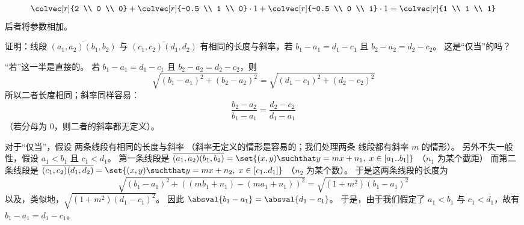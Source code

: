 \begin{exercises}
\begin{answer}
\begin{exparts}
          \begin{equation*}
            \colvec[r]{2 \\ 0 \\ 0}
              +\colvec[r]{-0.5 \\ 1 \\ 0}\cdot 1
              +\colvec[r]{-0.5 \\ 0 \\ 1}\cdot 1
            =\colvec[r]{1 \\ 1 \\ 1}
          \end{equation*}
          后者将参数相加。
      \end{exparts}
    \end{answer}
  \item 
    证明：线段
    \( \overline{(a_1,a_2)(b_1,b_2)} \) 与
    \( \overline{(c_1,c_2)(d_1,d_2)} \)
    有相同的长度与斜率，若
    \(  b_1-a_1=d_1-c_1 \) 且 \( b_2-a_2=d_2-c_2 \)。
    这是“仅当”的吗？
    \begin{answer}
      “若”这一半是直接的。
      若 \( b_1-a_1=d_1-c_1 \) 且 \( b_2-a_2=d_2-c_2 \)，则
      \begin{equation*}
        \sqrt{(b_1-a_1)^2+(b_2-a_2)^2}
        =\sqrt{(d_1-c_1)^2+(d_2-c_2)^2}
      \end{equation*}
      所以二者长度相同；斜率同样容易：
      \begin{equation*}
        \frac{b_2-a_2}{b_1-a_1}
        =\frac{d_2-c_2}{d_1-a_1}
      \end{equation*}
      （若分母为 \( 0 \)，则二者的斜率都无定义）。

     对于“仅当”，假设
     两条线段有相同的长度与斜率
     （斜率无定义的情形是容易的；我们处理两条
     线段都有斜率 \( m \) 的情形）。
     另外不失一般性，假设 $a_1<b_1$ 且
     $c_1<d_1$。
     第一条线段是
     \( \overline{(a_1,a_2)(b_1,b_2)}=
     \set{(x,y)\suchthat y=mx+n_1,\; x\in [a_1..b_1]} \)
     （$n_1$ 为某个截距）
     而第二条线段是 \( \overline{(c_1,c_2)(d_1,d_2)}=
     \set{(x,y)\suchthat y=mx+n_2,\; x\in [c_1..d_1]} \)
     （$n_2$ 为某个数）。
     于是这两条线段的长度为
     \begin{equation*}
     \sqrt{(b_1-a_1)^2+((mb_1+n_1)-(ma_1+n_1))^2}
       =\sqrt{(1+m^2)(b_1-a_1)^2}
     \end{equation*}
     以及，类似地，\( \sqrt{(1+m^2)(d_1-c_1)^2} \)。
     因此 \( \absval{b_1-a_1}=\absval{d_1-c_1} \)。
     于是，由于我们假定了 \( a_1<b_1 \) 与 \( c_1<d_1 \)，故有
     \( b_1-a_1=d_1-c_1 \)。


\end{answer}
\end{exercises}
